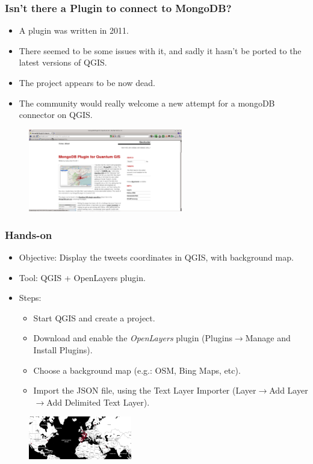 \documentclass[hyperref={pdfpagelabels=true}]{beamer}
\begin{document}
\begin{frame}
\frametitle{Isn't there a Plugin to connect to MongoDB?}
\begin{itemize}
  \item<1->A plugin was written in 2011.
  \item<3->There seemed to be some issues with it, and sadly it hasn't be ported to the latest versions of QGIS.
  \item<4->The project appears to be now dead.
  \item<5->The community would really welcome a new attempt for a mongoDB connector on QGIS.  
\end{itemize}      
  \begin{figure}  
      \includegraphics[width=0.6\textwidth]{mongodbplugin.png}\\
    \end{figure}         
\end{frame}

\begin{frame}
\frametitle{Hands-on}
\begin{itemize}
  \item<1->Objective: Display the tweets coordinates in QGIS, with background map.
  \item<1->Tool: QGIS + OpenLayers plugin.
  \item<1->Steps: \small{  
  \begin{itemize}
    \item<2->Start QGIS and create a project.  
    \item<2->Download and enable the \textit{OpenLayers} plugin (Plugins$\rightarrow$Manage and Install Plugins).
    \item<2->Choose a background map (e.g.: OSM, Bing Maps, etc).
    \item<2->Import the JSON file, using the Text Layer Importer (Layer$\rightarrow$Add Layer$\rightarrow$Add Delimited Text Layer).
  \end{itemize}   }
\end{itemize}  

  \begin{figure}  
      \includegraphics[width=0.4\textwidth]{import.png}\\
    \end{figure}         

\end{frame}
\end{document}
